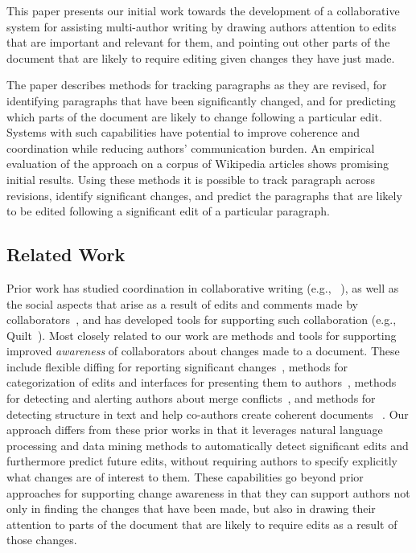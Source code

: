 This paper presents our initial work towards the development of a
collaborative system for assisting multi-author writing by drawing
authors attention to edits that are important and relevant for them, and
pointing out other parts of the document that are likely to require
editing given changes they have just made.

The paper describes methods for tracking paragraphs as they are revised,
for identifying paragraphs that have been significantly changed, and for
predicting which parts of the document are likely to change following a
particular edit. Systems with such capabilities have potential to
improve coherence and coordination while reducing authors' communication
burden. An empirical evaluation of the approach on a corpus of Wikipedia
articles shows promising initial results. Using these methods it is
possible to track paragraph across revisions, identify significant
changes, and predict the paragraphs that are likely to be edited
following a significant edit of a particular paragraph.

\subsection{Related Work}\label{related-work}

Prior work has studied coordination in collaborative writing (e.g.,
~\cite{neuwirth2001computer,kittur2007he}), as well as the social
aspects that arise as a result of edits and comments made by
collaborators~\cite{birnholtz2013write}, and has developed tools for
supporting such collaboration (e.g., Quilt~\cite{fish1988quilt}). Most
closely related to our work are methods and tools for supporting
improved \emph{awareness} of collaborators about changes made to a
document. These include flexible diffing for reporting significant
changes~\cite{neuwirth1992flexible}, methods for categorization of edits
and interfaces for presenting them to
authors~\cite{fong2010did,papadopoulou2007structured,tam2006framework},
methods for detecting and alerting authors about merge
conflicts~\cite{hainsworth2006enabling}, and methods for detecting
structure in text and help co-authors create coherent documents~
\cite{de2007narrative}. Our approach differs from these prior works in
that it leverages natural language processing and data mining methods to
automatically detect significant edits and furthermore predict future
edits, without requiring authors to specify explicitly what changes are
of interest to them. These capabilities go beyond prior approaches for
supporting change awareness in that they can support authors not only in
finding the changes that have been made, but also in drawing their
attention to parts of the document that are likely to require edits as a
result of those changes.


